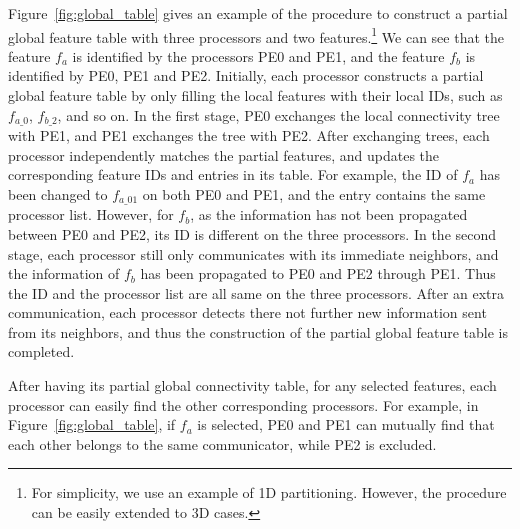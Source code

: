 Figure~\ref{fig:global_table} gives an example of the procedure to construct a partial global feature table with three processors and two features.\footnote{For simplicity, we use an example of 1D partitioning. However, the procedure can be easily extended to 3D cases.} We can see that the feature $f_a$ is identified by the processors PE0 and PE1, and the feature $f_b$ is identified by PE0, PE1 and PE2. Initially, each processor constructs a partial global feature table by only filling the local features with their local IDs, such as $f_{a\_0}$, $f_{b\_2}$, and so on. In the first stage, PE0 exchanges the local connectivity tree with PE1, and PE1 exchanges the tree with PE2. After exchanging trees, each processor independently matches the partial features, and updates the corresponding feature IDs and entries in its table. For example, the ID of $f_a$ has been changed to $f_{a\_01}$ on both PE0 and PE1, and the entry contains the same processor list. However, for $f_b$, as the information has not been propagated between PE0 and PE2, its ID is different on the three processors. In the second stage, each processor still only communicates with its immediate neighbors, and the information of $f_b$ has been propagated to PE0 and PE2 through PE1. Thus the ID and the processor list are all same on the three processors. After an extra communication, each processor detects there not further new information sent from its neighbors, and thus the construction of the partial global feature table is completed.

After having its partial global connectivity table, for any selected features, each processor can easily find the other corresponding processors. For example, in Figure~\ref{fig:global_table}, if $f_a$ is selected, PE0 and PE1 can mutually find that each other belongs to the same communicator, while PE2 is excluded.


% 
% 

